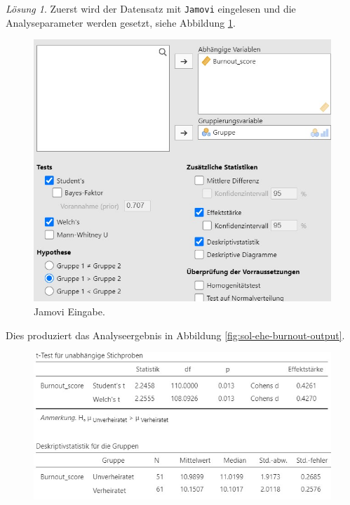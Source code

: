 \documentclass[
]{book}
\theoremstyle{definition}
\theoremstyle{definition}
\theoremstyle{definition}
\theoremstyle{definition}
\theoremstyle{remark}
\newtheorem*{solution}{Lösung}
\begin{document}
\begin{solution}

Zuerst wird der Datensatz mit \texttt{Jamovi} eingelesen und die Analyseparameter werden gesetzt, siehe Abbildung \ref{fig:sol-ehe-burnout-input}.

\begin{figure}

{\centering \includegraphics[width=1\linewidth]{figures/06-exr-ehe-burnout-jmv-input} 

}

\caption{Jamovi Eingabe.}\label{fig:sol-ehe-burnout-input}
\end{figure}

Dies produziert das Analyseergebnis in Abbildung \ref{fig:sol-ehe-burnout-output}.

\begin{figure}

{\centering \includegraphics[width=1\linewidth]{figures/06-exr-ehe-burnout-jmv-output} 

}
\end{figure}
\end{solution}
\end{document}
